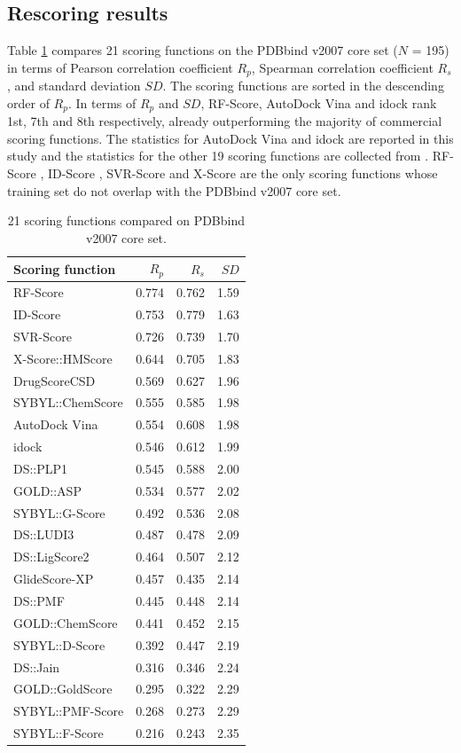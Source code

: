 \subsection{Rescoring results}

Table \ref{istar:ScoringFunctionComparison} compares 21 scoring functions on the PDBbind v2007 core set ($N$ = 195) in terms of Pearson correlation coefficient $R_p$, Spearman correlation coefficient $R_s$, and standard deviation $SD$. The scoring functions are sorted in the descending order of $R_p$. In terms of $R_p$ and $SD$, RF-Score, AutoDock Vina and idock rank 1st, 7th and 8th respectively, already outperforming the majority of commercial scoring functions. The statistics for AutoDock Vina and idock are reported in this study and the statistics for the other 19 scoring functions are collected from \citep{1313,564,1305,1295}. RF-Score \citep{564}, ID-Score \citep{1305}, SVR-Score \citep{1295} and X-Score \citep{573} are the only scoring functions whose training set do not overlap with the PDBbind v2007 core set.

\begin{table}
\caption{21 scoring functions compared on PDBbind v2007 core set.}
\label{istar:ScoringFunctionComparison}
\begin{tabular}{lrrr}
\hline
Scoring function & $R_p$ & $R_s$ & $SD$\\
\hline
RF-Score & 0.774 & 0.762 & 1.59\\
ID-Score & 0.753 & 0.779 & 1.63\\
SVR-Score & 0.726 & 0.739 & 1.70\\
X-Score::HMScore & 0.644 & 0.705 & 1.83\\
DrugScoreCSD & 0.569 & 0.627 & 1.96\\
SYBYL::ChemScore & 0.555 & 0.585 & 1.98\\
AutoDock Vina & 0.554 & 0.608 & 1.98\\
idock & 0.546 & 0.612 & 1.99\\
DS::PLP1 & 0.545 & 0.588 & 2.00\\
GOLD::ASP & 0.534 & 0.577 & 2.02\\
SYBYL::G-Score & 0.492 & 0.536 & 2.08\\
DS::LUDI3 & 0.487 & 0.478 & 2.09\\
DS::LigScore2 & 0.464 & 0.507 & 2.12\\
GlideScore-XP & 0.457 & 0.435 & 2.14\\
DS::PMF & 0.445 & 0.448 & 2.14\\
GOLD::ChemScore & 0.441 & 0.452 & 2.15\\
SYBYL::D-Score & 0.392 & 0.447 & 2.19\\
DS::Jain & 0.316 & 0.346 & 2.24\\
GOLD::GoldScore & 0.295 & 0.322 & 2.29\\
SYBYL::PMF-Score & 0.268 & 0.273 & 2.29\\
SYBYL::F-Score & 0.216 & 0.243 & 2.35\\
\hline
\end{tabular}
\end{table}

